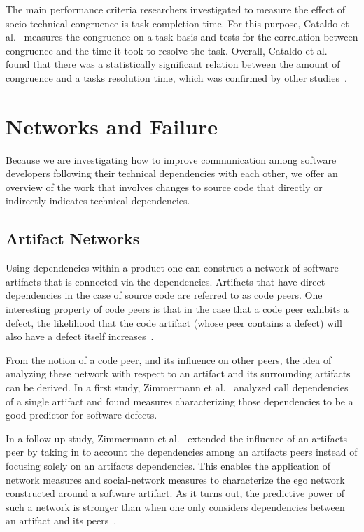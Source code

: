 The main performance criteria researchers investigated to measure the effect of socio-technical congruence is task completion time.
For this purpose, Cataldo et al.~\cite{cataldo:cscw:2006} measures the congruence on a task basis and tests for the correlation between congruence and the time it took to resolve the task.
Overall, Cataldo et al.~\cite{cataldo:cscw:2006} found that there was a statistically significant relation between the amount of congruence and a tasks resolution time, which was confirmed by other studies~\cite{valetto:msr:2007,ehrlich:stc:2008}.


\section{Networks and Failure}
Because we are investigating how to improve communication among software developers following their technical dependencies with each other, we offer an overview of the work that involves changes to source code that directly or indirectly indicates technical dependencies. 


\subsection{Artifact Networks}
\label{chap:6:an}
Using dependencies within a product one can construct a network of software artifacts that is connected via the dependencies.
Artifacts that have direct dependencies in the case of source code are referred to as code peers.
One interesting property of code peers is that in the case that a code peer exhibits a defect, the likelihood that the code artifact (whose peer contains a defect) will also have a defect itself increases~\cite{nguyen:icse:2010}.

From the notion of a code peer, and its influence on other peers, the idea of analyzing these network with respect to an artifact and its surrounding artifacts can be derived.
In a first study, Zimmermann et al.~\cite{zimmermann:icse:2008} analyzed call dependencies of a single artifact and found measures characterizing those dependencies to be a good predictor for software defects.

In a follow up study, Zimmermann et al.~\cite{zimmermann:esem:2009} extended the influence of an artifacts peer by taking in to account the dependencies among an artifacts peers instead of focusing solely on an artifacts dependencies.
This enables the application of network measures and social-network measures to characterize the ego network constructed around a software artifact.
As it turns out, the predictive power of such a network is stronger than when one only considers dependencies between an artifact and its peers~\cite{zimmermann:esem:2009}.

